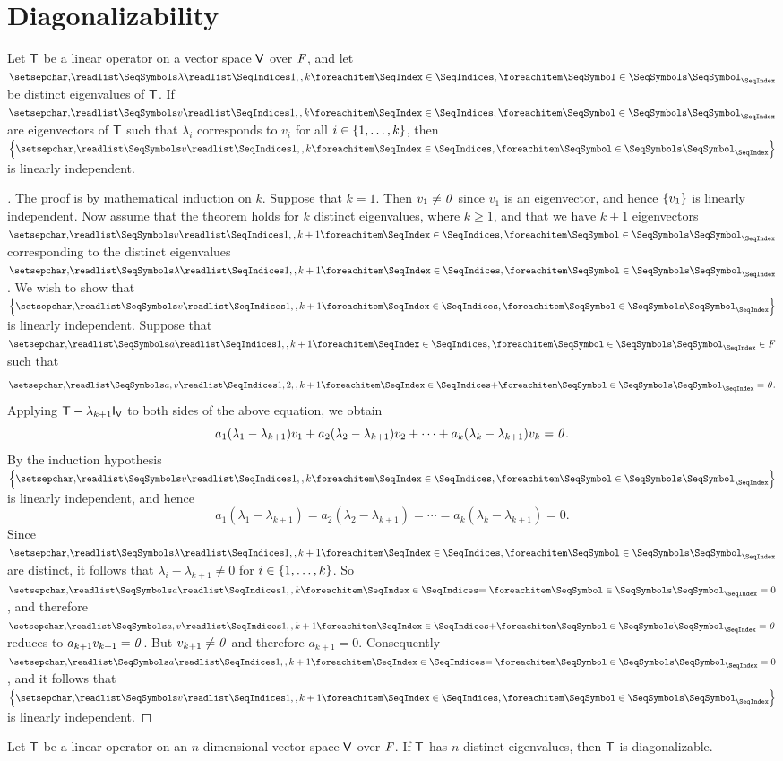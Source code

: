 \section{Diagonalizability}\label{sec:5.2}

\begin{thm}\label{5.5}
  Let \(\mathsf{T}\) be a linear operator on a vector space \(\mathsf{V}\) over \(\mathit{F}\), and let \(\seq{\lambda}{1,,k}\) be distinct eigenvalues of \(\mathsf{T}\).
  If \(\seq{v}{1,,k}\) are eigenvectors of \(\mathsf{T}\) such that \(\lambda_i\) corresponds to \(v_i\) for all \(i \in \left\lbrace1, \dots, k\right\rbrace\), then \(\set{\seq{v}{1,,k}}\) is linearly independent.
\end{thm}

\begin{proof}[]
  The proof is by mathematical induction on \(k\).
  Suppose that \(k = 1\).
  Then \(v_1 \neq \mathit{0}\) since \(v_1\) is an eigenvector, and hence \(\left\lbrace v_1\right\rbrace\) is linearly independent.
  Now assume that the theorem holds for \(k\) distinct eigenvalues, where \(k \geq 1\), and that we have \(k + 1\) eigenvectors \(\seq{v}{1,,k+1}\) corresponding to the distinct eigenvalues \(\seq{\lambda}{1,,k+1}\).
  We wish to show that \(\set{\seq{v}{1,,k+1}}\) is linearly independent.
  Suppose that \(\seq{a}{1,,k+1} \in \F\) such that
  \[
    \seq[+]{a,v}{1,2,,k+1} = \zv.
  \]
  Applying \(\T - \lambda_{k + 1} \IT[\V]\) to both sides of the above equation, we obtain
  \[
    a_1 (\lambda_1 - \lambda_{k + 1}) v_1 + a_2 (\lambda_2 - \lambda_{k + 1}) v_2 + \cdots + a_k (\lambda_k - \lambda_{k + 1}) v_k = \mathit{0}.
  \]
  By the induction hypothesis \(\set{\seq{v}{1,,k}}\) is linearly independent, and
  hence
  \[
    a_1 (\lambda_1 - \lambda_{k + 1}) = a_2 (\lambda_2 - \lambda_{k + 1}) = \cdots = a_k (\lambda_k - \lambda_{k + 1}) = 0.
  \]
  Since \(\seq{\lambda}{1,,k+1}\) are distinct, it follows that \(\lambda_i - \lambda_{k + 1} \neq 0\) for \(i \in \left\lbrace1, \dots, k\right\rbrace\).
  So \(\seq[=]{a}{1,,k} = 0\), and therefore \(\seq[+]{a,v}{1,,k+1} = \zv\) reduces to \(a_{k + 1} v_{k + 1} = \mathit{0}\).
  But \(v_{k + 1} \neq \mathit{0}\) and therefore \(a_{k + 1} = 0\).
  Consequently \(\seq[=]{a}{1,,k+1} = 0\), and it follows that \(\set{\seq{v}{1,,k+1}}\) is linearly independent.
\end{proof}

\begin{cor}\label{5.2.1}
  Let \(\mathsf{T}\) be a linear operator on an \(n\)-dimensional vector space \(\mathsf{V}\) over \(\mathit{F}\).
  If \(\mathsf{T}\) has \(n\) distinct eigenvalues, then \(\mathsf{T}\) is diagonalizable.
\end{cor}

